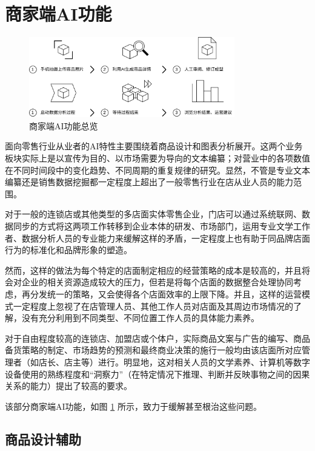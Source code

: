 \newpage
\section{商家端AI功能}
\label{sec:owner_features}

\begin{figure}[htbp]
	\centering
	\includegraphics[width=0.8\textwidth]{./imgs/ai-owner-workflow.png}
	\caption{商家端AI功能总览}
	\label{fig:ai-owner-workflow}
\end{figure}

面向零售行业从业者的AI特性主要围绕着商品设计和图表分析展开。这两个业务板块实际上是以宣传为目的、以市场需要为导向的文本编纂；对营业中的各项数值在不同时间段中的变化趋势、不同周期的重复规律的研究。显然，不管是专业文本编纂还是销售数据挖掘都一定程度上超出了一般零售行业在店从业人员的能力范围。

对于一般的连锁店或其他类型的多店面实体零售企业，门店可以通过系统联网、数据同步的方式将这两项工作转移到企业本体的研发、市场部门，运用专业文学工作者、数据分析人员的专业能力来缓解这样的矛盾，一定程度上也有助于同品牌店面行为的标准化和品牌形象的塑造。

然而，这样的做法为每个特定的店面制定相应的经营策略的成本是较高的，并且将会对企业的相关资源造成较大的压力，但若是将每个店面的数据整合处理协同考虑，再分发统一的策略，又会使得各个店面效率的上限下降。并且，这样的运营模式一定程度上忽视了在店管理人员、其他工作人员对店面及其周边市场情况的了解，没有充分利用到不同类型、不同位置工作人员的具体能力素养。

对于自由程度较高的连锁店、加盟店或个体户，实际商品文案与广告的编写、商品备货策略的制定、市场趋势的预测和最终商业决策的施行一般均由该店面所对应管理者（如店长、店主等）进行。明显地，这对相关人员的文学素养、计算机等数字设备使用的熟练程度和“洞察力”（在特定情况下推理、判断并反映事物之间的因果关系的能力）提出了较高的要求。

该部分商家端AI功能，如图 \ref{fig:ai-owner-workflow} 所示，致力于缓解甚至根治这些问题。

\subsection{商品设计辅助}


